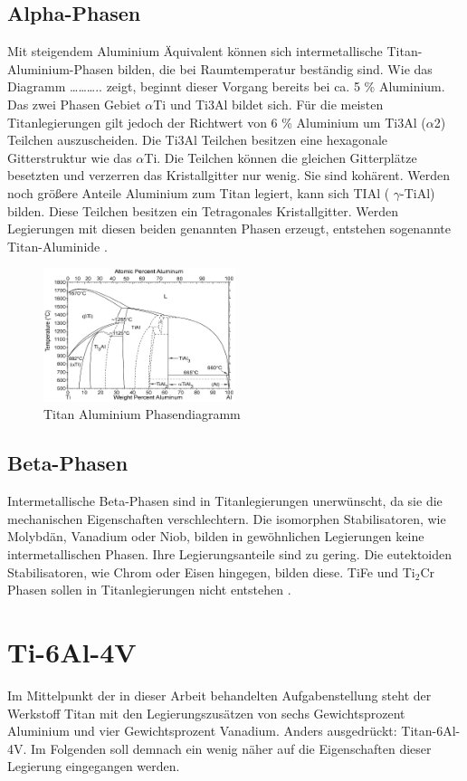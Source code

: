 \documentclass[a4paper, 11pt]{tubsreprt}
\begin{document}
\subsection{Alpha-Phasen}
Mit steigendem Aluminium Äquivalent können sich intermetallische Titan-Aluminium-Phasen bilden, die bei Raumtemperatur beständig sind. Wie das Diagramm ……….. zeigt, beginnt dieser Vorgang bereits bei ca. 5 \% Aluminium. Das zwei Phasen Gebiet $\alpha$Ti und Ti3Al bildet sich. Für die meisten Titanlegierungen gilt jedoch der Richtwert von 6 \% Aluminium um Ti3Al ($\alpha$2) Teilchen auszuscheiden.  Die Ti3Al Teilchen besitzen eine hexagonale Gitterstruktur wie das $\alpha$Ti. Die Teilchen können  die gleichen Gitterplätze besetzten und verzerren das Kristallgitter nur wenig. Sie sind kohärent.
Werden noch größere Anteile Aluminium  zum Titan legiert, kann sich TIAl ( $\gamma$-TiAl) bilden. Diese Teilchen besitzen ein Tetragonales Kristallgitter.
 Werden Legierungen mit diesen beiden genannten Phasen erzeugt, entstehen sogenannte Titan-Aluminide \cite{Luetjering2007}.   
\begin{figure}
\centering
\includegraphics[width=0.5\textwidth]{Bilder/Titanaluminide.png}
\caption{Titan Aluminium Phasendiagramm}
\end{figure}
 
\subsection{Beta-Phasen}
Intermetallische Beta-Phasen sind in Titanlegierungen unerwünscht, da sie die mechanischen Eigenschaften verschlechtern. Die isomorphen Stabilisatoren, wie Molybdän, Vanadium oder Niob, bilden in gewöhnlichen Legierungen keine intermetallischen Phasen. Ihre Legierungsanteile sind zu gering. Die eutektoiden Stabilisatoren, wie Chrom oder Eisen hingegen, bilden diese. TiFe und Ti$_{2}$Cr Phasen sollen in Titanlegierungen nicht entstehen \cite{Luetjering2007}.
\section{Ti-6Al-4V}
Im Mittelpunkt der in dieser Arbeit behandelten Aufgabenstellung steht der Werkstoff Titan mit den Legierungszusätzen von sechs Gewichtsprozent Aluminium und vier Gewichtsprozent Vanadium. Anders ausgedrückt: Titan-6Al-4V. Im Folgenden soll demnach ein wenig näher auf die Eigenschaften dieser Legierung eingegangen werden. 
\end{document}
